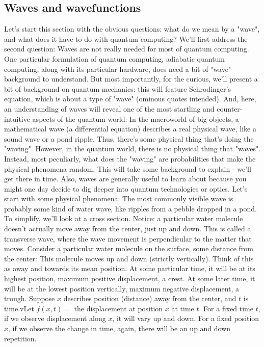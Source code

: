 \documentclass[main.tex]{subfiles}
\begin{document}
\subsection{Waves and wavefunctions}

Let's start this section with the obvious questions: what do we mean by a "wave", and what does it have to do with quantum computing? We'll first address the second question: Waves are not really needed for most of quantum computing. One particular formulation of quantum computing, adiabatic quantum computing, along with its particular hardware, does need a bit of "wave" background to understand. But most importantly, for the curious, we'll present a bit of background on quantum mechanics: this will feature Schrodinger's equation, which is about a type of "wave" (ominous quotes intended). And, here, an understanding of waves will reveal one of the most startling and counter-intuitive aspects of the quantum world: In the macroworld of big objects, a mathematical wave (a differential equation) describes a real physical wave, like a sound wave or a pond ripple. Thus, there's some physical thing that's doing the "waving". However, in the quantum world, there is no physical thing that "waves". Instead, most peculiarly, what does the "waving" are probabilities that make the physical phenomena random. This will take some background to explain - we'll get there in time. Also, waves are generally useful to learn about because you might one day decide to dig deeper into quantum technologies or optics. Let's start with some physical phenomena: The most commonly visible wave is probably some kind of water wave, like ripples from a pebble dropped in a pond. To simplify, we'll look at a cross section. Notice: a particular water molecule doesn't actually move away from the center, just up and down. This is called a transverse wave, where the wave movement is perpendicular to the matter that moves. Consider a particular water molecule on the surface, some distance from the center: This molecule moves up and down (strictly vertically). Think of this as away and towards its mean position. At some particular time, it will be at its highest position, maximum positive displacement, a crest. At some later time, it will be at the lowest position vertically, maximum negative displacement, a trough. Suppose $x$ describes position (distance) away from the center, and $t$ is time.vLet $f(x, t)=$ the displacement at position $x$ at time $t$. For a fixed time $t$, if we observe displacement along $x$, it will vary up and down. For a fixed position $x$, if we observe the change in time, again, there will be an up and down repetition.\\
\end{document}
